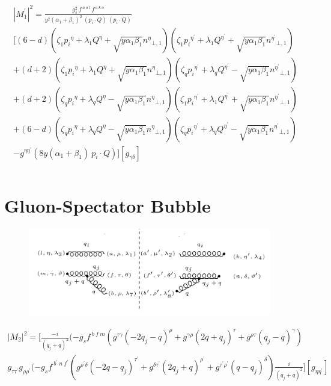 \begin{equation}
\begin{split}
{|{M}^{\prime}_1|}^2 =\frac{g_s^2 \:f^{\:a\:o\:l}\: f^{\:a\:k\:o}}{y^2({\alpha_1}+\beta_1)^2\:(p_i\cdot Q) \:(p_i\cdot Q)} \\
[(6-d)(\zeta_1 {p_i}^{\eta} + \lambda_1{Q}^{\eta} + \sqrt{y\alpha_1\beta_1}{n^{\eta}}_{\bot,1})(\zeta_1 {p_i}^{{\eta}^{\prime}} + \lambda_1{Q}^{{\eta}^{\prime}} + \sqrt{y\alpha_1\beta_1}{n^{{\eta}^{\prime}}}_{\bot,1})\\
+(d+2)(\zeta_1 {p_i}^{\eta} + \lambda_1{Q}^{\eta} + \sqrt{y\alpha_1\beta_1}{n^{\eta}}_{\bot,1})(\zeta_q {p_i}^{{\eta}^{\prime}} + \lambda_q{Q}^{{\eta}^{\prime}} - \sqrt{y\alpha_1\beta_1}{n^{{\eta}^{\prime}}}_{\bot,1})\\
+(d+2)(\zeta_q {p_i}^{\eta} + \lambda_q{Q}^{\eta} - \sqrt{y\alpha_1\beta_1}{n^{\eta}}_{\bot,1})(\zeta_1 {p_i}^{{\eta}^{\prime}} + \lambda_1{Q}^{{\eta}^{\prime}} + \sqrt{y\alpha_1\beta_1}{n^{{\eta}^{\prime}}}_{\bot,1})\\
+(6-d)(\zeta_q {p_i}^{\eta} + \lambda_q{Q}^{\eta} - \sqrt{y\alpha_1\beta_1}{n^{\eta}}_{\bot,1})(\zeta_q {p_i}^{{\eta}^{\prime}} + \lambda_q{Q}^{{\eta}^{\prime}} - \sqrt{y\alpha_1\beta_1}{n^{{\eta}^{\prime}}}_{\bot,1})\\
-g^{{\eta}{{\eta}^{\prime}}}(8y({\alpha_1}+\beta_1)\:p_i\cdot Q )][g_{{\gamma}{\delta}}]\\
\\
\end{split}
\end{equation}
\pagebreak

\section{Gluon-Spectator Bubble}
\begin{figure}[ht!]
\centering
\includegraphics[width=0.95\textwidth]{images/GG/M2Squer}
\end{figure}
\begin{equation}
\begin{split}
|M_2|^2=[\frac{-i}{(q_j +q)^2}(-g_s f^{\:b\:f\:m}(g^{{\tau}{\gamma}}(-2q_j-q)^{\rho}+g^{{\gamma}{\rho}}(2q +q_j)^{\tau}+g^{{\rho}{\tau}}(q_j -q)^{\gamma})\\g_{{\tau}{{\tau}^{\prime}}}g_{{\rho}{{\rho}^{\prime}}}
(-g_s f^{\:b^{\prime}\:n\:f^{\prime}}(g^{{{\rho}^{\prime}}{{\delta}}}(-2q-q_j)^{{\tau}^{\prime}}+g^{{{\delta}}{{\tau}^{\prime}}}(2q_j +q)^{{\rho}^{\prime}}+g^{{{\tau}^{\prime}}{{\rho}^{\prime}}}(q-q_j)^{{\delta}})\frac{i}{(q_j +q)^2}][g_{{\eta}{{\eta}^{\prime}}}]
\end{split}
\end{equation}

